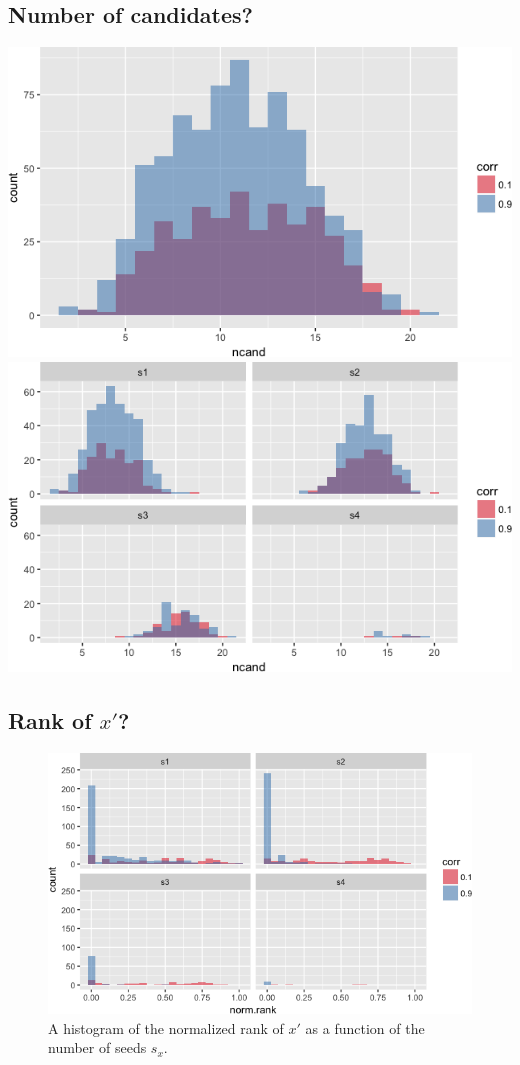 \documentclass[]{article}
\begin{document}
\subsection{Number of candidates?}\label{number-of-candidates}

\includegraphics{vn_files/figure-latex/cand-1.png}
\includegraphics{vn_files/figure-latex/ncand-1.png}

\subsection{\texorpdfstring{Rank of
\(x'\)?}{Rank of x'?}}\label{rank-of-x}

\begin{figure}
\centering
\includegraphics{vn_files/figure-latex/rank-1.png}
\caption{A histogram of the normalized rank of \(x'\) as a function of
the number of seeds \(s_x\).}
\end{figure}
\end{document}

